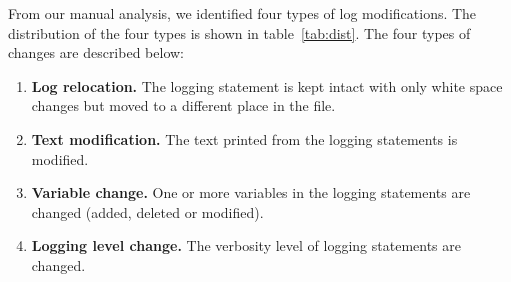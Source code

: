From our manual analysis, we identified four types of log modifications. The distribution of the four types is shown in table~\ref{tab:dist}. The four types of changes are described below:

\begin{enumerate}
	\item \textbf{Log relocation.} The logging statement is kept intact with only white space changes but moved to a different place in the file.
	\item \textbf{Text modification.} The text printed from the logging statements is modified.
	\item \textbf{Variable change.} One or more variables in the logging statements are changed (added, deleted or modified).
	\item \textbf{Logging level change. } The verbosity level of logging statements are changed.
\end{enumerate}

